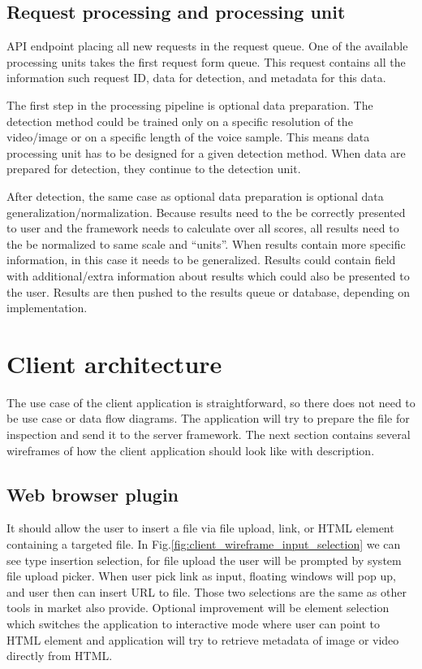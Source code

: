 \section{Request processing and processing unit}

API endpoint placing all new requests in the request queue. One of the available processing units takes the first request form queue. This request contains all the information such request ID, data for detection, and metadata for this data.

The first step in the processing pipeline is optional data preparation. The detection method could be trained only on a specific resolution of the video/image or on a specific length of the voice sample. This means data processing unit has to be designed for a given detection method. When data are prepared for detection, they continue to the detection unit.

After detection, the same case as optional data preparation is optional data generalization/normalization. Because results need to the be correctly presented to user and the framework needs to calculate over all scores, all results need to the be normalized to same scale and “units”. When results contain more specific information, in this case it needs to be generalized. Results could contain field with additional/extra information about results which could also be presented to the user. Results are then pushed to the results queue or database, depending on implementation.

\chapter{Client architecture}

The use case of the client application is straightforward, so there does not need to be use case or data flow diagrams. The application will try to prepare the file for inspection and send it to the server framework. The next section contains several wireframes of how the client application should look like with description.

\section{Web browser plugin}

It should allow the user to insert a file via file upload, link, or HTML element containing a targeted file. In Fig.\ref{fig:client_wireframe_input_selection} we can see type insertion selection, for file upload the user will be prompted by system file upload picker. When user pick link as input, floating windows will pop up, and user then can insert URL to file. Those two selections are the same as other tools in market also provide. Optional improvement will be element selection which switches the application to interactive mode where user can point to HTML element and application will try to retrieve metadata of image or video directly from HTML. 

